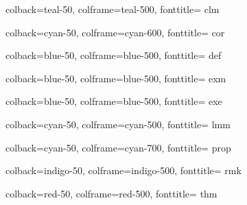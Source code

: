 
{
    colback=teal-50,
    colframe=teal-500,
    fonttitle=\bfseries
}{clm}

{
    colback=cyan-50,
    colframe=cyan-600,
    fonttitle=\bfseries
}{cor}

{
    colback=blue-50,
    colframe=blue-500,
    fonttitle=\bfseries
}{def}

{
    colback=blue-50,
    colframe=blue-500,
    fonttitle=\bfseries
}{exm}

{
    colback=blue-50,
    colframe=blue-500,
    fonttitle=\bfseries
}{exe}

{
    colback=cyan-50,
    colframe=cyan-500,
    fonttitle=\bfseries
}{lmm}

{
    colback=cyan-50,
    colframe=cyan-700,
    fonttitle=\bfseries
}{prop}

{
    colback=indigo-50,
    colframe=indigo-500,
    fonttitle=\bfseries
}{rmk}

{
    colback=red-50,
    colframe=red-500,
    fonttitle=\bfseries
}{thm}
